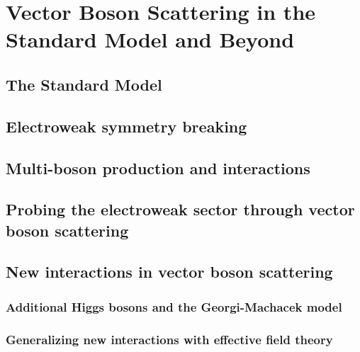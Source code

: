 \chapter{Vector Boson Scattering in the Standard Model and Beyond}
\label{ch:phenomenology}

\section{The Standard Model}
\section{Electroweak symmetry breaking}
\section{Multi-boson production and interactions}
\section{Probing the electroweak sector through vector boson scattering}
\section{New interactions in vector boson scattering}
\subsection{Additional Higgs bosons and the Georgi-Machacek model}
\subsection{Generalizing new interactions with effective field theory}
